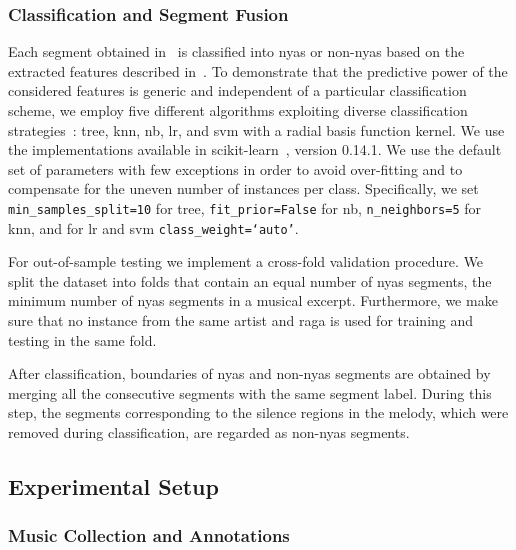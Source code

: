 {\subsubsection{Classification and Segment Fusion}

Each segment obtained in~ is classified into \gls{nyas} or non-\gls{nyas} based on the extracted features described in~. To demonstrate that the predictive power of the considered features is generic and independent of a particular classification scheme, we employ five different algorithms exploiting diverse classification strategies~\citep{Hastie09BOOK}: \gls{tree}, \gls{knn}, \gls{nb}, \gls{lr}, and \gls{svm} with a radial basis function kernel. We use the implementations available in scikit-learn~\citep{scikitlearn}, version 0.14.1. We use the default set of parameters with few exceptions in order to avoid over-fitting and to compensate for the uneven number of instances per class. Specifically, we set \texttt{min\_samples\_split=10} for \acrshort{tree}, \texttt{fit\_prior=False} for \gls{nb}, \texttt{n\_neighbors=5} for \gls{knn}, and for \gls{lr} and \gls{svm} \texttt{class\_weight=`auto'}.

For out-of-sample testing we implement a cross-fold validation procedure. We split the dataset into folds that contain an equal number of \gls{nyas} segments, the minimum number of \gls{nyas} segments in a musical excerpt. Furthermore, we make sure that no instance from the same artist and \gls{raga} is used for training and testing in the same fold.

After classification, boundaries of \gls{nyas} and non-\gls{nyas} segments are obtained by merging all the consecutive segments with the same segment label. During this step, the segments corresponding to the silence regions in the melody, which were removed during classification, are regarded as non-\gls{nyas} segments.

\subsection{Experimental Setup}
\label{sec:pre_processing_nyas_segmentation_experimental_setup}

\subsubsection{Music Collection and Annotations}

}
